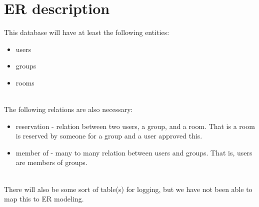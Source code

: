 \documentclass{article}
\begin{document}
\section{ER description}
This database will have at least the following entities:
\begin{itemize}
\item users
\item groups
\item rooms
\end{itemize}
\\
The following relations are also necessary:
\begin{itemize}
\item reservation - relation between two users, a group, and a room. That is a
room is reserved by someone for a group and a user approved this. 
\item member of - many to many relation between users and groups. That is, users
are members of groups.
\end{itemize}
\\
There will also be some sort of table(s) for logging, but we have not been able to
map this to ER modeling. 


%
\end{document}
